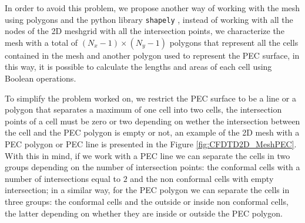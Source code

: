 \documentclass[12pt, oneside]{book}
\begin{document}
In order to avoid this problem, we propose another way of working with the mesh using polygons and the python library \texttt{shapely} \cite{Gillies_Shapely_2024}, instead of working with all the nodes of the 2D meshgrid with all the intersection points, we characterize the mesh with a total of $(N_x - 1) \times (N_y - 1)$ polygons that represent all the cells contained in the mesh and another polygon used to represent the PEC surface, in this way, it is possible to calculate the lengths and areas of each cell using Boolean operations. 

To simplify the problem worked on, we restrict the PEC surface to be a line or a polygon that separates a maximum of one cell into two cells, the intersection points of a cell must be zero or two depending on wether the intersection between the cell and the PEC polygon is empty or not, an example of the 2D mesh with a PEC polygon or PEC line is presented in the Figure \ref{fig:CFDTD2D_MeshPEC}. With this in mind, if we work with a PEC line we can separate the cells in two groups depending on the number of intersection points: the conformal cells with a number of intersections equal to $2$ and the non conformal cells with empty intersection; in a similar way, for the PEC polygon we can separate the cells in three groups: the conformal cells and the outside or inside non conformal cells, the latter depending on whether they are inside or outside the PEC polygon.
\end{document}
